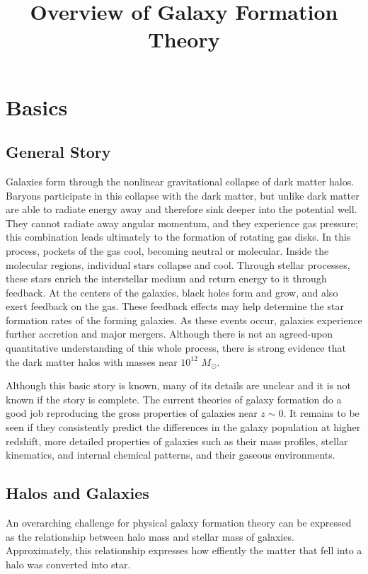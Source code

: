 \title{\bf Overview of Galaxy Formation Theory}

\section{Basics}

\subsection{General Story}

Galaxies form through the nonlinear gravitational collapse of dark
matter halos. Baryons participate in this collapse with the dark
matter, but unlike dark matter are able to radiate energy away and
therefore sink deeper into the potential well. They cannot radiate
away angular momentum, and they experience gas pressure; this
combination leads ultimately to the formation of rotating gas
disks. In this process, pockets of the gas cool, becoming neutral or
molecular. Inside the molecular regions, individual stars collapse and
cool. Through stellar processes, these stars enrich the interstellar
medium and return energy to it through feedback. At the centers of the
galaxies, black holes form and grow, and also exert feedback on the
gas. These feedback effects may help determine the star formation
rates of the forming galaxies. As these events occur, galaxies
experience further accretion and major mergers. Although there is not
an agreed-upon quantitative understanding of this whole process, there
is strong evidence that the dark matter halos with masses near
$10^{12}$ $M_\odot$.

Although this basic story is known, many of its details are unclear
and it is not known if the story is complete. The current theories of
galaxy formation do a good job reproducing the gross properties of
galaxies near $z\sim 0$. It remains to be seen if they consistently
predict the differences in the galaxy population at higher redshift,
more detailed properties of galaxies such as their mass profiles,
stellar kinematics, and internal chemical patterns, and their gaseous
environments.

\subsection{Halos and Galaxies}

An overarching challenge for physical galaxy formation theory can be
expressed as the relationship between halo mass and stellar mass of
galaxies. Approximately, this relationship expresses how effiently the
matter that fell into a halo was converted into star.

